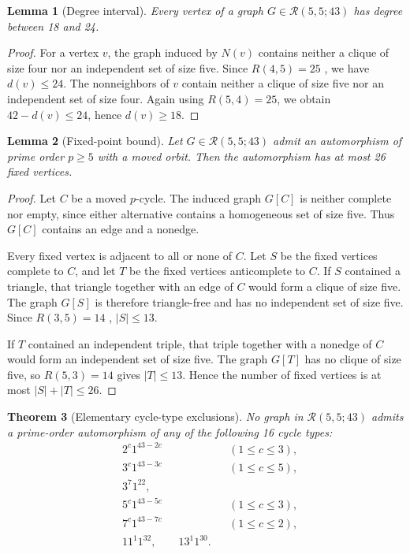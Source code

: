 \documentclass[11pt]{article}
\newtheorem{theorem}{Theorem}
\newtheorem{lemma}[theorem]{Lemma}
\newcommand{\Rcal}{\mathcal{R}}
\begin{document}
\begin{lemma}[Degree interval]
\label{lem:degree}
Every vertex of a graph $G\in\Rcal(5,5;43)$ has degree between 18 and 24.
\end{lemma}

\begin{proof}
For a vertex $v$, the graph induced by $N(v)$ contains neither a clique of
size four nor an independent set of size five. Since $R(4,5)=25$
\cite{McKayRadziszowski1995}, we have $d(v)\le24$. The nonneighbors of $v$
contain neither a clique of size five nor an independent set of size four.
Again using $R(5,4)=25$, we obtain $42-d(v)\le24$, hence $d(v)\ge18$.
\end{proof}

\begin{lemma}[Fixed-point bound]
\label{lem:fixed}
Let $G\in\Rcal(5,5;43)$ admit an automorphism of prime order $p\ge5$ with a
moved orbit. Then the automorphism has at most 26 fixed vertices.
\end{lemma}

\begin{proof}
Let $C$ be a moved $p$-cycle. The induced graph $G[C]$ is neither complete
nor empty, since either alternative contains a homogeneous set of size five.
Thus $G[C]$ contains an edge and a nonedge.

Every fixed vertex is adjacent to all or none of $C$. Let $S$ be the fixed
vertices complete to $C$, and let $T$ be the fixed vertices anticomplete to
$C$. If $S$ contained a triangle, that triangle together with an edge of
$C$ would form a clique of size five. The graph $G[S]$ is therefore
triangle-free and has no independent set of size five. Since $R(3,5)=14$
\cite{GreenwoodGleason1955}, $|S|\le13$.

If $T$ contained an independent triple, that triple together with a nonedge
of $C$ would form an independent set of size five. The graph $G[T]$ has no
clique of size five, so $R(5,3)=14$ gives $|T|\le13$. Hence the number of
fixed vertices is at most $|S|+|T|\le26$.
\end{proof}

\begin{theorem}[Elementary cycle-type exclusions]
\label{thm:elementary}
No graph in $\Rcal(5,5;43)$ admits a prime-order automorphism of any of the
following 16 cycle types:
\[
\begin{aligned}
&2^c1^{43-2c} &&(1\le c\le3),\\
&3^c1^{43-3c} &&(1\le c\le5),\\
&3^7 1^{22},\\
&5^c1^{43-5c} &&(1\le c\le3),\\
&7^c1^{43-7c} &&(1\le c\le2),\\
&11^1 1^{32},\qquad 13^1 1^{30}.&
\end{aligned}
\]
\end{theorem}
\end{document}
